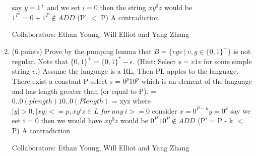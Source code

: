 \documentclass[11pt]{article}
\begin{document}
\begin{enumerate}
say $y = 1^+$ and we set $i = 0$ then the string $xy^0z$ would be $1^{P'} = 0 + 1^P \notin ADD$ (P' $<$ P)
A contradiction

Collaborators: Ethan Young, Will Elliot and Yang Zhang

\item (6 points) Prove by the pumping lemma that $B=\{vgv\ |\ v, g\in\{0,1\}^+\}$ is not regular. Note that $\{0,1\}^+=\{0,1\}^*-\epsilon$.
(Hint: Select $s=v1v$ for some simple string $v$.)
\newline 
Assume the language is a RL, Then PL apples to the language. \newline 
There exist a constant P \newline 
select s = $0^p10^p$ which is an element of the language and has length greater than (or equal to P). \newline 
= $0..0(p length)1 0..0(P length)$ = xyz \newline where $|y| > 0, |xy| <= p, xy^{i}z \in L \ for \  any \ i >=0$\newline 
consider $x = 0^{P-k} y = 0^k$ say we set i = 0 then we would have $xy^0z$ would be $0^{P'} 10^P \notin ADD$ (P' = P - k $<$ P) A contradiction

Collaborators: Ethan Young, Will Elliot and Yang Zhang

\end{enumerate}
\end{document}
